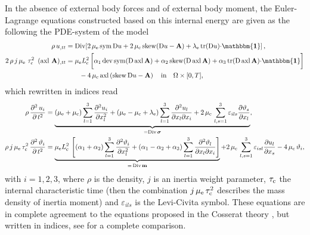 \documentclass[10pt]{article}
\newcommand{\id}{{\mathbf{\mathbbm{1}}}}
\newcommand{\tr}{{\rm tr}}
\newcommand{\dev}{{\rm dev}}
\newcommand{\sym}{{\rm sym}}
\newcommand{\skw}{{\rm skew}}
\newcommand{\Div}{{\rm Div}}
\newcommand{\axl}{{\rm axl}}
\def\dd{\displaystyle}
\def\dd{\displaystyle}
\begin{document}
 
In the absence of  external  body forces and of   external  body moment, the Euler-Lagrange equations constructed  {based} on this internal energy are given as the following   the PDE-system of the model  \cite{Eringen99}
\begin{align}\label{eqisaxl}
	\rho\,u_{,tt}&=\Div[2\,\mu_{\rm e} \, \sym\,\mathrm{D}u +2\,\mu_{\rm c} \,\skw(\mathrm{D}u -\mathbf{A})+ \lambda_{\rm e}\, \tr(\mathrm{D}u ){\cdot} \id]\, ,\notag\\
	2\,\rho\, {j\,\mu_{\rm e}\,}\,\tau_{\rm c}^2\,\,\,(\axl\, \,\mathbf{A})_{,tt}&={\mu_{\rm e}L_{\rm c}^2}\,\bigg[{\alpha_1 }\,\dev\,\sym (\mathrm{D}\, \axl  \,\mathbf{A})+{\alpha_2}\,\skw (\mathrm{D}\, \axl  \,\mathbf{A})+ \alpha_3\,\tr(\mathrm{D}\, \axl  \,\mathbf{A}){\cdot } \id\bigg]
	\\&\ \ \ \ \ \ -4\,\mu_{\rm c} \,\axl\,(\skw\,\mathrm{D}u -\mathbf{A})\,  \ \ \ \text {in}\ \ \  \Omega\times [0,T],\notag
\end{align}
 which rewritten in indices read
\begin{align}\label{PDE}
	\rho\,\frac{\partial^2 \,u_i}{\partial\, t^2}&=\underbrace{(\mu_{\rm e} +\mu_{\rm c})\dd\sum_{l=1}^3\frac{\partial^2 u_i }{\partial x_l^2}+(\mu_{\rm e} -\mu_{\rm c}+\lambda_{\rm e} )\dd\sum_{l=1}^3\frac{\partial^2 u_l }{\partial x_l\partial x_i}+2\,\mu_{\rm c} \,\sum_{l,s=1}^3\varepsilon _{ils}\frac{\partial \vartheta _s }{\partial x_l}}_{={\rm Div}\,\boldsymbol{\sigma}},
	\vspace{1.2mm}\\
	\rho\, j\,\mu_{\rm e}\,\tau_{\rm c}^2\,\frac{\partial^2 \,\vartheta_i}{\partial\, t^2}&=\underbrace{{\mu_{\rm e}L_{\rm c}^2}\,\left[(\alpha_1+\alpha_2)\dd\sum_{l=1}^3\frac{\partial^2 \vartheta _i }{\partial x_l^2}+(\alpha_1-\alpha_2+\alpha_3)\dd\sum_{l=1}^3\frac{\partial^2 \vartheta_l }{\partial x_l\partial x_i}\right]}_{=\,{\rm Div}\,\mathbf{ m}}+2\,\mu_{\rm c} \,\sum_{l,s=1}^3\varepsilon _{isl}\frac{\partial u_l }{\partial x_s}-4\, \mu_{\rm c}\, \vartheta _i, \notag
\end{align}
with $i=1,2,3$, where  {$\rho$ is the density,  $j$ is an inertia weight parameter,  $\tau_{\rm c}$ the internal characteristic time (then the combination $j\,\mu_{\rm e}\,\tau_{\rm c}^2$ describes the mass density of inertia moment) \cite[page 163]{Eringen99}}  and $\varepsilon _{ils}$ is the Levi-Civita symbol.
	These equations are in complete agreement to the equations proposed in the Cosserat theory \cite{Eringen99}, but written in indices, see \cite{ghiba2023cosserat} for a complete comparison.
\end{document}
